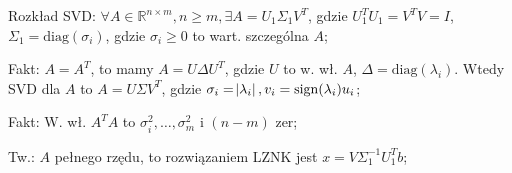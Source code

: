 

\entry
Rozkład SVD:
$\forall A \in \mathbb{R}^{n\times m}, n \geq m, \exists A=U_1\Sigma_1V^T$, gdzie
$U_1^TU_1=V^TV=I$,
$\Sigma_1 = \mathrm{diag}(\sigma_i)$, gdzie
$\sigma_i \geq 0$ to wart. szczególna $A$;

\entry
Fakt:
$A=A^T$, to mamy $A=U\Delta U^T$, gdzie $U$ to w. wł. $A$,
$\Delta= \mathrm{diag}(\lambda_i)$.
Wtedy SVD dla $A$ to $A=U\Sigma V^T$, gdzie
$\sigma_i=\abs{\lambda_i}, v_i=\mathrm{sign}(\lambda_i)u_i$;

\entry
Fakt:
W. wł. $A^TA$ to $\sigma_i^2,\ldots,\sigma_m^2$ i $(n-m)$ zer;

\entry
Tw.:
$A$ pełnego rzędu, to rozwiązaniem LZNK jest $x=V\Sigma_1^{-1}U_1^Tb$;

